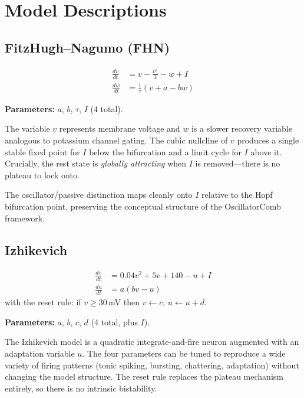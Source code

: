 \documentclass[11pt]{article}
\begin{document}
\section{Model Descriptions}

\subsection{FitzHugh--Nagumo (FHN)}

\begin{align}
    \frac{dv}{dt} &= v - \frac{v^3}{3} - w + I \label{eq:fhn_v} \\
    \frac{dw}{dt} &= \frac{1}{\tau}(v + a - bw) \label{eq:fhn_w}
\end{align}

\textbf{Parameters:} $a$, $b$, $\tau$, $I$ (4 total).

The variable $v$ represents membrane voltage and $w$ is a slower recovery variable analogous
to potassium channel gating. The cubic nullcline of $v$ produces a single stable fixed point
for $I$ below the bifurcation and a limit cycle for $I$ above it. Crucially, the rest state
is \emph{globally attracting} when $I$ is removed---there is no plateau to lock onto.

The oscillator/passive distinction maps cleanly onto $I$ relative to the Hopf bifurcation
point, preserving the conceptual structure of the OscillatorComb framework.

\subsection{Izhikevich}

\begin{align}
    \frac{dv}{dt} &= 0.04v^2 + 5v + 140 - u + I \label{eq:izh_v} \\
    \frac{du}{dt} &= a(bv - u) \label{eq:izh_u}
\end{align}
with the reset rule: if $v \geq 30$\,mV then $v \leftarrow c$, $u \leftarrow u + d$.

\textbf{Parameters:} $a$, $b$, $c$, $d$ (4 total, plus $I$).

The Izhikevich model is a quadratic integrate-and-fire neuron augmented with an adaptation
variable $u$. The four parameters can be tuned to reproduce a wide variety of firing patterns
(tonic spiking, bursting, chattering, adaptation) without changing the model structure.
The reset rule replaces the plateau mechanism entirely, so there is no intrinsic bistability.
\end{document}
